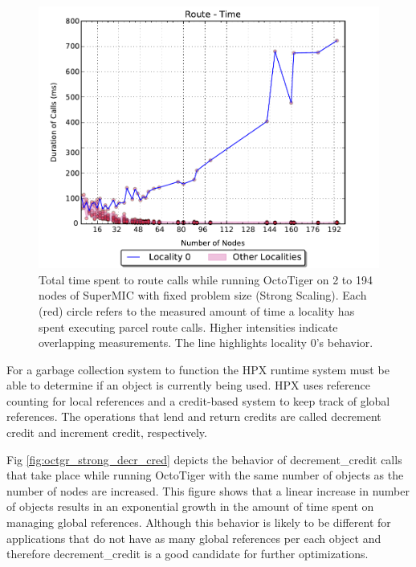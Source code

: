 \begin{figure}[t]
    \centering
    \includegraphics[width=.54\textwidth,height=\textheight,keepaspectratio]{graphs/octotiger_route_time}
    \caption{Total time spent to route calls while running OctoTiger on 2 to 194 nodes of SuperMIC with fixed problem size (Strong Scaling). Each (red) circle refers to the measured amount of time a locality has spent executing parcel route calls. Higher intensities indicate overlapping measurements. The line highlights locality 0's behavior.}
    \label{fig:octgr_strong_route_time}
\end{figure}

For a garbage collection system to function the HPX runtime system must be able
to determine if an object is currently being used. HPX uses reference counting
for local references and a credit-based system to keep track of global
references. The operations that lend and return credits are called decrement
credit and increment credit, respectively.

Fig \ref{fig:octgr_strong_decr_cred} depicts the behavior of decrement\_credit
calls that take place while running OctoTiger with the same number of objects as
the number of nodes are increased. This figure shows that a
linear increase in number of objects results in an exponential growth
in the amount of time spent on managing global references. Although this
behavior is likely to be different for applications that do not have as many
global references per each object and therefore decrement\_credit is a good
candidate for further optimizations.

